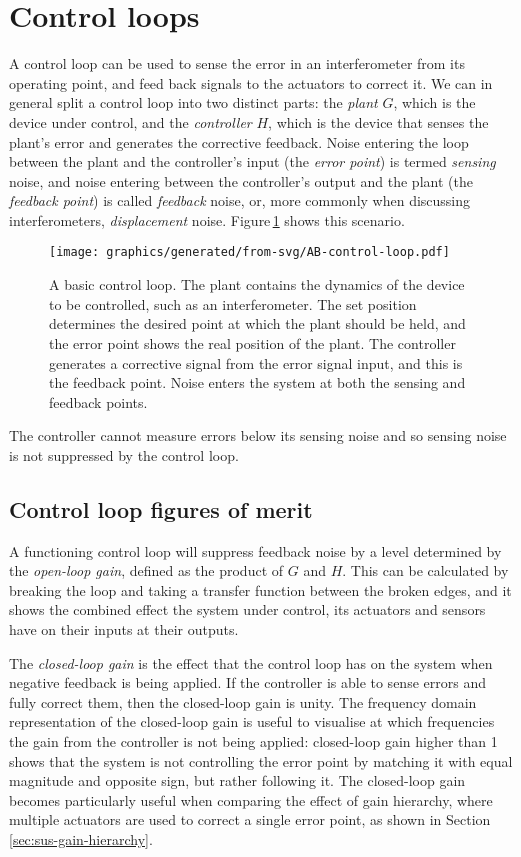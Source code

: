 \section{\label{sec:control-loops}Control loops}
A control loop can be used to sense the error in an interferometer from its operating point, and feed back signals to the actuators to correct it. We can in general split a control loop into two distinct parts: the \emph{plant} $G$, which is the device under control, and the \emph{controller} $H$, which is the device that senses the plant's error and generates the corrective feedback. Noise entering the loop between the plant and the controller's input (the \emph{error point}) is termed \emph{sensing} noise, and noise entering between the controller's output and the plant (the \emph{feedback point}) is called \emph{feedback} noise, or, more commonly when discussing interferometers, \emph{displacement} noise. Figure\,\ref{fig:control-loop} shows this scenario.

\begin{figure}
  \centering
  \texttt{[image: graphics/generated/from-svg/AB-control-loop.pdf]}
  \caption[A basic control loop]{\label{fig:control-loop}A basic control loop. The plant contains the dynamics of the device to be controlled, such as an interferometer. The set position determines the desired point at which the plant should be held, and the error point shows the real position of the plant. The controller generates a corrective signal from the error signal input, and this is the feedback point. Noise enters the system at both the sensing and feedback points.}
\end{figure}

The controller cannot measure errors below its sensing noise and so sensing noise is not suppressed by the control loop.

\subsection{Control loop figures of merit}
A functioning control loop will suppress feedback noise by a level determined by the \emph{open-loop gain}, defined as the product of $G$ and $H$. This can be calculated by breaking the loop and taking a transfer function between the broken edges, and it shows the combined effect the system under control, its actuators and sensors have on their inputs at their outputs.

The \emph{closed-loop gain} is the effect that the control loop has on the system when negative feedback is being applied. If the controller is able to sense errors and fully correct them, then the closed-loop gain is unity. The frequency domain representation of the closed-loop gain is useful to visualise at which frequencies the gain from the controller is not being applied: closed-loop gain higher than \num{1} shows that the system is not controlling the error point  by matching it with equal magnitude and opposite sign, but rather following it. The closed-loop gain becomes particularly useful when comparing the effect of gain hierarchy, where multiple actuators are used to correct a single error point, as shown in Section\,\ref{sec:sus-gain-hierarchy}.


